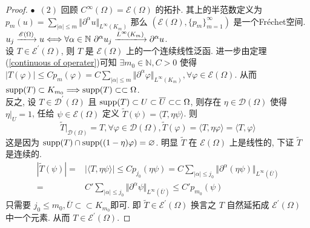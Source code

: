 \documentclass[11pt]{ctexart}[UTF8]
\begin{document}
\begin{proof}
    $\bullet$\  $(2)$ 回顾 $C^{\infty}(\Omega) = \mathscr{E}(\Omega)$ 的拓扑. 其上的半范数定义为 $p_{m}(u) = \sum\limits_{|\alpha| \leq m} \Vert \partial^{\alpha} u \Vert_{L^{\infty}(K_{m})}$
    那么 $(\mathscr{E}(\Omega), \{ p_m \}_{m=1}^{\infty})$ 是一个Fr\'echet空间. $u_{j} \xlongrightarrow{\mathscr{E}(\Omega)} u \Longleftrightarrow \forall \alpha \in \mathbb{N}\ \partial^{\alpha} u_{j} \xlongrightarrow{L^{\infty}(K_{m})} \partial^{\alpha} u$.\\
    设 $T \in \mathscr{E}^{\prime}(\Omega)$, 则 $T$ 是 $\mathscr{E}(\Omega)$ 上的一个连续线性泛函. 进一步由定理(\ref{continuous of operater})可知 $\exists m_{0} \in \mathbb{N}, C>0$ 
    使得 $\left| T(\varphi) \right| \leq C p_{m}(\varphi) = C \sum\limits_{|\alpha| \leq m} \Vert \partial^{\alpha} \varphi \Vert_{L^{\infty}(K_{m})}, \forall \varphi \in \mathscr{E}(\Omega)$. 
    从而 $\operatorname{supp}(T) \subset K_{m_0} \Longrightarrow \operatorname{supp}(T) \subset\subset \Omega$.\\
    反之, 设 $T \in \mathscr{D}^{\prime}(\Omega)$ 且 $\operatorname{supp}(T) \subset U \subset \overline{U} \subset\subset \Omega$, 
    则存在 $\eta \in \mathscr{D}(\Omega)$ 使得 $\eta\big|_{U} = 1$, 任给 $\psi \in \mathscr{E}(\Omega)$ 定义 $\widetilde{T}(\psi) = \langle T, \eta \psi \rangle$. 则
    \begin{equation*}
        \widetilde{T}\big|_{\mathscr{D}(\Omega)} = T, \forall \varphi \in \mathscr{D}(\Omega), \widetilde{T}(\varphi) = \langle T, \eta \varphi \rangle = \langle T, \varphi \rangle
    \end{equation*}
    这是因为 $\operatorname{supp}(T) \cap \operatorname{supp}((1-\eta)\varphi) = \varnothing$. 明显 $\widetilde{T}$ 在 $\mathscr{E}(\Omega)$ 上是线性的, 下证 $\widetilde{T}$ 是连续的. 
    \begin{equation*}
        \begin{aligned}
            \left| \widetilde{T}(\psi) \right| = & \left| \langle T, \eta \psi \rangle \right| \leq C p_{j_{0}}(\eta \psi) = C \sum\limits_{|\alpha| \leq j_0} \Vert \partial^{\alpha} (\eta \psi) \Vert_{L^{\infty}(\overline{U})} \\
            = & C' \sum\limits_{|\alpha| \leq j_{0}} \Vert \partial^{\alpha} \psi \Vert_{L^{\infty}(\overline{U})} \leq C' p_{m_0}(\psi)
        \end{aligned}
    \end{equation*}
    只需要 $j_{0} \leq m_0, \overline{U} \subset\subset K_{m_0}$即可. 即 $\widetilde{T} \in \mathscr{E}^{\prime}(\Omega)$ 
    换言之 $T$ 自然延拓成 $\mathscr{E}^{\prime}(\Omega)$ 中一个元素. 从而 $T \in \mathscr{E}^{\prime}(\Omega)$.\par

\end{proof}
\end{document}
